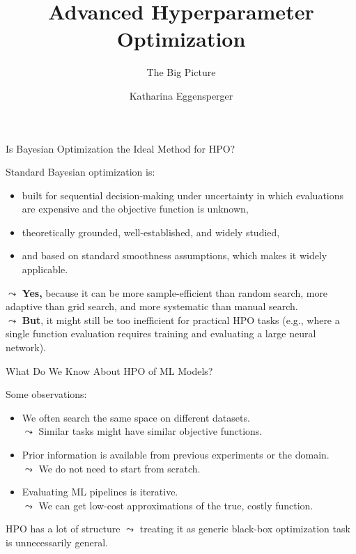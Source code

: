 \documentclass[main]{subfiles}
\title[Advanced Hyperparameter Optimization]{Advanced Hyperparameter Optimization}
\subtitle{The Big Picture}
\author[Katharina Eggensperger]{Katharina Eggensperger}
\date{}
\begin{document}
	
	\maketitle
	

\begin{frame}[c]{Is Bayesian Optimization the Ideal Method for HPO?}

Standard Bayesian optimization is:
\pause

\begin{itemize}
    \item built for sequential decision-making under uncertainty in which evaluations are expensive and the objective function is unknown,
    \pause
    \item theoretically grounded, well-established, and widely studied,
    \pause
    \item and based on standard smoothness assumptions, which makes it widely applicable.
\end{itemize}

\vspace{0.5cm}
\pause
$\leadsto$ \textbf{Yes,} because it can be more sample-efficient than random search, more adaptive than grid search, and more systematic than manual search. \\
\pause
$\leadsto$ \textbf{But}, it might still be too inefficient for practical HPO tasks (e.g., where a single function evaluation requires training and evaluating a large neural network).

\end{frame}
\begin{frame}[c]{What Do We Know About HPO of ML Models?}

Some observations:
\pause

\begin{itemize}
    \item We often search the same space on different datasets. \\ $\leadsto$ Similar tasks might have similar objective functions.
    \pause
    \item Prior information is available from previous experiments or the domain. \\ $\leadsto$ We do not need to start from scratch.
    \pause
    \item Evaluating ML pipelines is iterative. \\ $\leadsto$ We can get low-cost approximations of the true, costly function.
\end{itemize}
\pause

\vspace{1cm}
HPO has a lot of structure $\leadsto$ treating it as generic black-box optimization task is unnecessarily general.

\end{frame}
\end{document}
